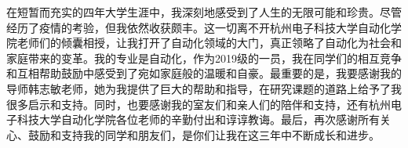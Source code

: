 
\acknowledgement


在短暂而充实的四年大学生涯中，我深刻地感受到了人生的无限可能和珍贵。尽管经历了疫情的考验，但我依然收获颇丰。这一切离不开杭州电子科技大学自动化学院老师们的倾囊相授，让我打开了自动化领域的大门，真正领略了自动化为社会和家庭带来的变革。我的专业是自动化，作为2019级的一员，我在同学们的相互竞争和互相帮助鼓励中感受到了宛如家庭般的温暖和自豪。最重要的是，我要感谢我的导师韩志敏老师，她为我提供了巨大的帮助和指导，在研究课题的道路上给予了我很多启示和支持。同时，也要感谢我的室友们和亲人们的陪伴和支持，还有杭州电子科技大学自动化学院各位老师的辛勤付出和谆谆教诲。最后，再次感谢所有关心、鼓励和支持我的同学和朋友们，是你们让我在这三年中不断成长和进步。

